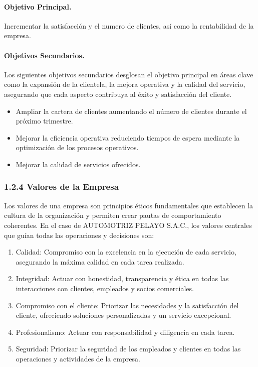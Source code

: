 \paragraph{Objetivo Principal. }Incrementar la satisfacción y el numero de clientes, así como la rentabilidad de la empresa.
\paragraph{Objetivos Secundarios. }Los siguientes objetivos secundarios desglosan el objetivo principal en áreas clave como la expansión de la clientela, la mejora operativa y la calidad del servicio, asegurando que cada aspecto contribuya al éxito y satisfacción del cliente.
\begin{itemize}
    \item Ampliar la cartera de clientes aumentando el número de clientes durante el próximo trimestre.
    \item Mejorar la eficiencia operativa reduciendo tiempos de espera mediante la optimización de los procesos operativos.
    \item Mejorar la calidad de servicios ofrecidos.
\end{itemize}

\subsubsection*{1.2.4 Valores de la Empresa}
Los valores de una empresa son principios éticos fundamentales que establecen la cultura de la organización y permiten crear pautas de comportamiento coherentes. En el caso de AUTOMOTRIZ PELAYO S.A.C., los valores centrales que guían todas las operaciones y decisiones son:
\begin{enumerate}
    \item Calidad: Compromiso con la excelencia en la ejecución de cada servicio, asegurando la máxima calidad en cada tarea realizada.
    \item Integridad: Actuar con honestidad, transparencia y ética en todas las interacciones con clientes, empleados y socios comerciales.
    \item Compromiso con el cliente: Priorizar las necesidades y la satisfacción del cliente, ofreciendo soluciones personalizadas y un servicio excepcional.
    \item Profesionalismo: Actuar con responsabilidad y diligencia en cada tarea.
    \item Seguridad: Priorizar la seguridad de los empleados y clientes en todas las operaciones y actividades de la empresa.
\end{enumerate}
